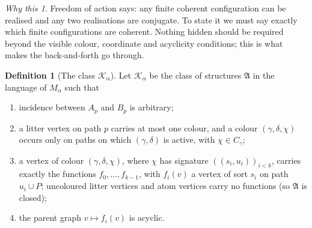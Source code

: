 \documentclass[11pt]{article}
\theoremstyle{definition}
\newtheorem{definition}[theorem]{Definition}
\theoremstyle{remark}
\newtheorem*{idea}{Why this}
\newcommand{\calK}{\mathcal K}
\begin{document}
\begin{idea}
Freedom of action says: any finite coherent configuration can be realised
and any two realisations are conjugate. To state it we must say exactly
which finite configurations are coherent. Nothing hidden should be
required beyond the visible colour, coordinate and acyclicity conditions;
this is what makes the back-and-forth go through.
\end{idea}

\begin{definition}[The class \(\calK_\alpha\)]
Let \(\calK_\alpha\) be the class of structures \(\mathfrak A\) in the
language of \(M_\alpha\) such that
\begin{enumerate}[nosep,label=(K\arabic*)]
\item incidence between \(A_p\) and \(B_p\) is arbitrary;
\item a litter vertex on path \(p\) carries at most one colour, and a
 colour \((\gamma,\delta,\chi)\) occurs only on paths on which
 \((\gamma,\delta)\) is active, with \(\chi\in C_\gamma\);
\item a vertex of colour \((\gamma,\delta,\chi)\), where \(\chi\) has
 signature \(((s_i,u_i))_{i<k}\), carries exactly the functions
 \(f_0,\dots,f_{k-1}\), with \(f_i(v)\) a vertex of sort \(s_i\) on path
 \(u_i\cup P\); uncoloured litter vertices and atom vertices carry no
 functions (so \(\mathfrak A\) is closed);
\item the parent graph \(v\mapsto f_i(v)\) is acyclic.
\end{enumerate}
\end{definition}
\end{document}
